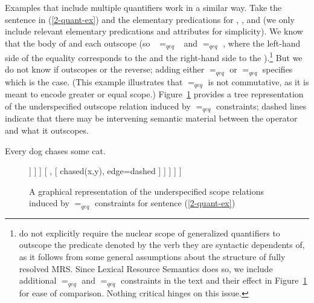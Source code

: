 \documentclass[output=paper
 	        ,biblatex
                ,babelshorthands
                ,newtxmath
                ,draftmode
                ,colorlinks, citecolor=brown
]{langscibook}
\begin{document}
Examples that include multiple quantifiers work in a similar way. Take the sentence in (\ref{2-quant-ex}) and the elementary predications for , , and  (we only include relevant elementary predications and attributes for simplicity). We know that the body of  and  each outscope  (so \mbox{ $=_{qeq}$ } and  $=_{qeq}$ , where the left-hand side of the equality corresponds to the  and the right-hand side to the ).\footnote{\citet{Copestakeetal2005} do not explicitly require the nuclear scope of generalized quantifiers to outscope the predicate denoted by the verb they are syntactic dependents of, as it follows from some general assumptions about the structure of fully resolved MRS. Since Lexical Resource Semantics does so, we include additional  $=_{qeq}$  and  $=_{qeq}$  constraints in the text and their effect in Figure~\ref{fig:MRS-tree} for ease of comparison. Nothing critical hinges on this issue.} But we do not know if  outscopes  or the reverse; adding either   $=_{qeq}$  or  $=_{qeq}$  specifies which is the case. (This example illustrates that $=_{qeq}$ is not commutative, as it is meant to encode greater or equal scope.) Figure~\ref{fig:MRS-tree} provides a tree representation of the underspecified outscope relation induced by $=_{qeq}$ constraints; dashed lines indicate that there may be intervening semantic material between the operator and what it outscopes.

\begin{exe}
\ex\label{2-quant-ex}Every dog chases some cat.
\ex\label{2-quant-sem}
\end{exe}

\begin{figure}
\begin{forest}
[ top
[ {chased(x,y)}, edge=dashed
	[ every, no edge
		[ dog(x), edge=dashed ]
		[ {}, no edge 
				[ some(y), no edge 
					[ cat (y), edge=dashed ] 
					[ {}, [ {chased(x,y)}, edge=dashed	 ] ] ] ] 
		[ {}, [ {chased(x,y)}, edge=dashed ] ]			
					] 
	]
	]
\end{forest}
\caption{\label{fig:MRS-tree}A graphical representation of the underspecified scope relations induced by $=_{qeq}$ constraints for sentence (\ref{2-quant-ex})}
\end{figure}
\end{document}
